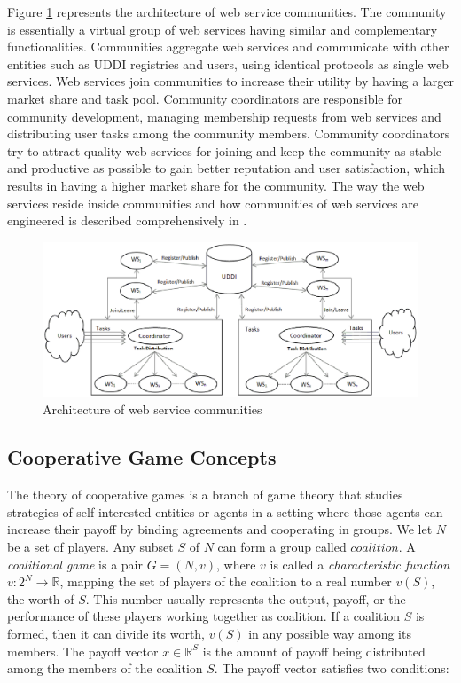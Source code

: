 \documentclass[10pt,journal,cspaper,compsoc]{IEEEtran}
\begin{document}
Figure \ref{fig_community} represents the architecture of web
service communities. The community is essentially a virtual group
of web services having similar and complementary functionalities.
Communities aggregate web services and communicate with other
entities such as UDDI registries and users, using identical
protocols as single web services. Web services join communities to
increase their utility by having a larger market share and task
pool. Community coordinators are
responsible for community development, managing membership
requests from web services and distributing user tasks among the
community members. Community coordinators try to attract quality
web services for joining and keep the community as stable and
productive as possible to gain better reputation and user
satisfaction, which results in having a higher market share for
the community. The way the web services reside inside communities
and how communities of web services are engineered is described
comprehensively in \cite{DBLP:journals/ijebr/MaamarSTBB09}.

\begin{figure}%
\centerline{\includegraphics[width=6.25in]{community.eps}}
\caption{Architecture of web service communities}
\label{fig_community}
\end{figure}

\subsection{Cooperative Game Concepts}
The theory of cooperative games is a branch of game theory that
studies strategies of self-interested entities or agents in a
setting where those agents can increase their payoff by binding
agreements and cooperating in groups. We let $N$ be a set of
players. Any subset $S$ of $N$ can form a group called
$coalition$. A \emph{coalitional game} is a pair $G = (N, v)$,
where $v$ is called a \emph{characteristic function} $v: 2^N \to
\mathbb{R}$, mapping the set of players of the coalition to a real
number $v(S)$, the worth of $S$. This number usually represents
the output, payoff, or the performance of these players working
together as coalition.  If a coalition $S$ is formed, then it can
divide its worth, $v(S)$ in any possible way among its members.
The payoff vector $x \in \mathbb{R}^S$ is the amount of payoff
being distributed among the members of the coalition $S$. The
payoff vector satisfies two conditions:
\end{document}
